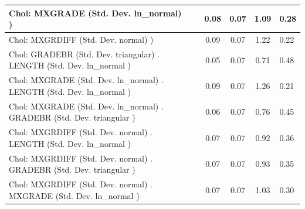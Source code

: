 \begin{table}
\begin{center}
\begin{tabular}{|l|l|c|c|c|l|}
			\hline
			 Chol: MXGRADE (Std. Dev. ln_normal) ) &  & 0.08 & 0.07 & 1.09 & 0.28 \\
			\hline
			 Chol: MXGRDIFF (Std. Dev. normal) ) &  & 0.09 & 0.07 & 1.22 & 0.22 \\
			\hline
			 Chol: GRADEBR (Std. Dev. triangular) . LENGTH (Std. Dev.   ln_normal ) &  & 0.05 & 0.07 & 0.71 & 0.48 \\
			\hline
			 Chol: MXGRADE (Std. Dev. ln_normal) . LENGTH (Std. Dev.   ln_normal ) &  & 0.09 & 0.07 & 1.26 & 0.21 \\
			\hline
			 Chol: MXGRADE (Std. Dev. ln_normal) . GRADEBR (Std. Dev.   triangular ) &  & 0.06 & 0.07 & 0.76 & 0.45 \\
			\hline
			 Chol: MXGRDIFF (Std. Dev. normal) . LENGTH (Std. Dev.   ln_normal ) &  & 0.07 & 0.07 & 0.92 & 0.36 \\
			\hline
			 Chol: MXGRDIFF (Std. Dev. normal) . GRADEBR (Std. Dev.   triangular ) &  & 0.07 & 0.07 & 0.93 & 0.35 \\
			\hline
			 Chol: MXGRDIFF (Std. Dev. normal) . MXGRADE (Std. Dev.   ln_normal ) &  & 0.07 & 0.07 & 1.03 & 0.30 \\
			\hline
		\end{tabular}
	\end{center}
\end{table}